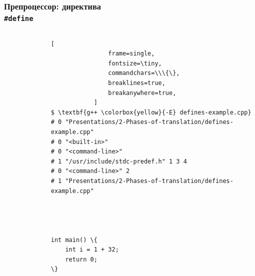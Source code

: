 \documentclass[compress]{beamer}
\begin{document}
\begin{frame}[fragile]

    \frametitle{Препроцессор: директива \\ \texttt{\#define}}

    \begin{columns}

        \begin{column}{0.5\textwidth}

            \begin{figure}[H]
            \end{figure}

        \end{column}

        \begin{column}{0.5\textwidth}

            \begin{Verbatim}[
                frame=single,
                fontsize=\tiny,
                commandchars=\\\{\},
                breaklines=true,
                breakanywhere=true,
            ]
$ \textbf{g++ \colorbox{yellow}{-E} defines-example.cpp}
# 0 "Presentations/2-Phases-of-translation/defines-example.cpp"
# 0 "<built-in>"
# 0 "<command-line>"
# 1 "/usr/include/stdc-predef.h" 1 3 4
# 0 "<command-line>" 2
# 1 "Presentations/2-Phases-of-translation/defines-example.cpp"




int main() \{
    int i = 1 + 32;
    return 0;
\}
            \end{Verbatim}

        \end{column}

    \end{columns}

\end{frame}
\end{document}
